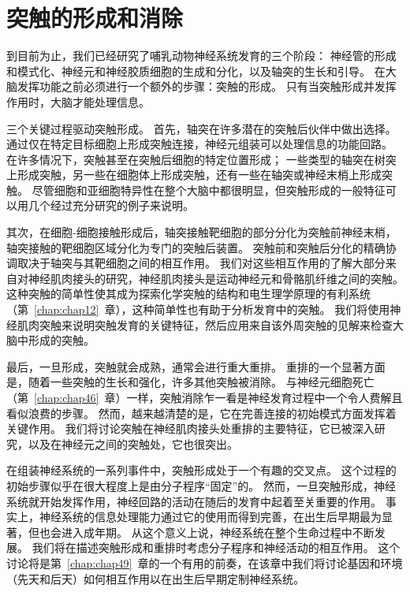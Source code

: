 \chapter{突触的形成和消除} \label{chap:chap48}



到目前为止，我们已经研究了哺乳动物神经系统发育的三个阶段：
神经管的形成和模式化、神经元和神经胶质细胞的生成和分化，以及轴突的生长和引导。
在大脑发挥功能之前必须进行一个额外的步骤：突触的形成。
只有当突触形成并发挥作用时，大脑才能处理信息。


三个关键过程驱动突触形成。
首先，轴突在许多潜在的突触后伙伴中做出选择。
通过仅在特定目标细胞上形成突触连接，神经元组装可以处理信息的功能回路。
在许多情况下，突触甚至在突触后细胞的特定位置形成；
一些类型的轴突在树突上形成突触，另一些在细胞体上形成突触，还有一些在轴突或神经末梢上形成突触。
尽管细胞和亚细胞特异性在整个大脑中都很明显，但突触形成的一般特征可以用几个经过充分研究的例子来说明。


其次，在细胞-细胞接触形成后，轴突接触靶细胞的部分分化为突触前神经末梢，轴突接触的靶细胞区域分化为专门的突触后装置。
突触前和突触后分化的精确协调取决于轴突与其靶细胞之间的相互作用。
我们对这些相互作用的了解大部分来自对神经肌肉接头的研究，神经肌肉接头是运动神经元和骨骼肌纤维之间的突触。
这种突触的简单性使其成为探索化学突触的结构和电生理学原理的有利系统（第~\ref{chap:chap12}~章），这种简单性也有助于分析发育中的突触。
我们将使用神经肌肉突触来说明突触发育的关键特征，然后应用来自该外周突触的见解来检查大脑中形成的突触。


最后，一旦形成，突触就会成熟，通常会进行重大重排。
重排的一个显著方面是，随着一些突触的生长和强化，许多其他突触被消除。
与神经元细胞死亡（第~\ref{chap:chap46}~章）一样，突触消除乍一看是神经发育过程中一个令人费解且看似浪费的步骤。
然而，越来越清楚的是，它在完善连接的初始模式方面发挥着关键作用。
我们将讨论突触在神经肌肉接头处重排的主要特征，它已被深入研究，以及在神经元之间的突触处，它也很突出。


在组装神经系统的一系列事件中，突触形成处于一个有趣的交叉点。
这个过程的初始步骤似乎在很大程度上是由分子程序“固定”的。
然而，一旦突触形成，神经系统就开始发挥作用，神经回路的活动在随后的发育中起着至关重要的作用。
事实上，神经系统的信息处理能力通过它的使用而得到完善，在出生后早期最为显著，但也会进入成年期。
从这个意义上说，神经系统在整个生命过程中不断发展。 我们将在描述突触形成和重排时考虑分子程序和神经活动的相互作用。
这个讨论将是第~\ref{chap:chap49}~章的一个有用的前奏，在该章中我们将讨论基因和环境（先天和后天）如何相互作用以在出生后早期定制神经系统。



